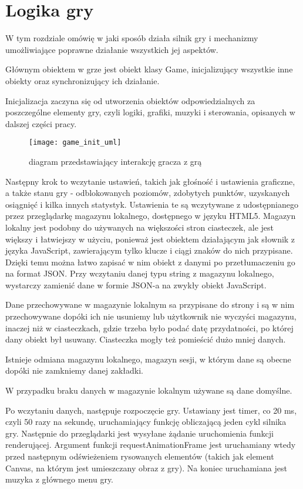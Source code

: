 \chapter{Logika gry}
\thispagestyle{chapterBeginStyle}
\label{chapter_logic}

W tym rozdziale omówię w jaki sposób działa silnik gry i mechanizmy umożliwiające poprawne działanie wszystkich jej aspektów.

Głównym obiektem w grze jest obiekt klasy Game, inicjalizujący wszystkie inne obiekty oraz synchronizujący ich działanie.

Inicjalizacja zaczyna się od utworzenia obiektów odpowiedzialnych za poszczególne elementy gry, czyli logiki, grafiki, muzyki i sterowania, opisanych w dalszej czę\'sci pracy.

\begin{wrapfigure}{l}{0.39\textwidth}
	\centering
	\noindent\texttt{[image: game\_init\_uml]}
	\caption{diagram przedstawiający interakcję gracza z grą}
\end{wrapfigure}
Następny krok to wczytanie ustawień, takich jak gło\'sno\'sć i ustawienia graficzne, a także stanu gry - odblokowanych poziomów, zdobytych punktów, uzyskanych osiągnięć i kilka innych statystyk. Ustawienia te są wczytywane z udostępnianego przez przeglądarkę magazynu lokalnego, dostępnego w języku HTML5. Magazyn lokalny jest podobny do używanych na większo\'sci stron ciasteczek, ale jest większy i łatwiejszy w użyciu, ponieważ jest obiektem działającym jak słownik z języka JavaScript, zawierającym tylko klucze i ciągi znaków do nich przypisane. Dzięki temu można łatwo zapisać w nim obiekt z danymi po przetłumaczeniu go na format JSON. Przy wczytaniu danej typu string z magazynu lokalnego, wystarczy zamienić dane w formie JSON-a na zwykły obiekt JavaScript.

Dane przechowywane w magazynie lokalnym sa przypisane do strony i są w nim przechowywane dopóki ich nie usuniemy lub użytkownik nie wyczy\'sci magazynu, inaczej niż w ciasteczkach, gdzie trzeba było podać datę przydatno\'sci, po której dany obiekt był usuwany. Ciasteczka mogły też pomie\'scić dużo mniej danych.

Istnieje odmiana magazynu lokalnego, magazyn sesji, w którym dane są obecne dopóki nie zamkniemy danej zakładki.

W przypadku braku danych w magazynie lokalnym używane są dane domy\'slne.

Po wczytaniu danych, następuje rozpoczęcie gry. Ustawiany jest timer, co 20 ms, czyli 50 razy na sekundę, uruchamiający funkcję obliczającą jeden cykl silnika gry. Następnie do przeglądarki jest wysyłane żądanie uruchomienia funkcji renderującej. Argument funkcji requestAnimationFrame jest uruchamiany wtedy przed następnym od\'swieżeniem rysowanych elementów (takich jak element Canvas, na którym jest umieszczany obraz z gry). Na koniec uruchamiana jest muzyka z głównego menu gry.

